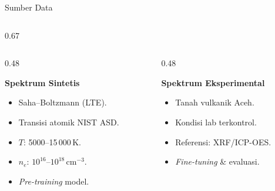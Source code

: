 \documentclass{beamer}
\begin{document}
\begin{frame}{Sumber Data}
\begin{columns}[T,onlytextwidth]
\begin{column}{0.67\textwidth}
      \vspace{0.2em}
      \begin{columns}[T]
        \begin{column}{0.48\textwidth}
          {\footnotesize
          \textbf{Spektrum Sintetis}
          \begin{itemize}\setlength{\itemsep}{1pt}
            \item Saha--Boltzmann (LTE).
            \item Transisi atomik NIST ASD.
            \item $T$: 5000--15\,000\,K.
            \item $n_e$: $10^{16}$--$10^{18}$\,cm$^{-3}$.
            \item \textit{Pre-training} model.
          \end{itemize}
          }
        \end{column}
        \begin{column}{0.48\textwidth}
          {\footnotesize
          \textbf{Spektrum Eksperimental}
          \begin{itemize}\setlength{\itemsep}{1pt}
            \item Tanah vulkanik Aceh.
            \item Kondisi lab terkontrol.
            \item Referensi: XRF/ICP-OES.
            \item \textit{Fine-tuning} \& evaluasi.
          \end{itemize}
          }
        \end{column}
      \end{columns}
    \end{column}
  \end{columns}
\end{frame}
\end{document}
